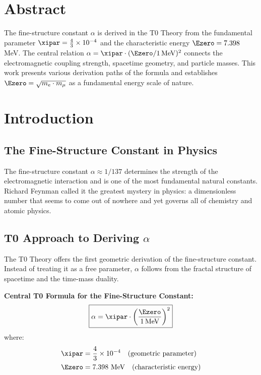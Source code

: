 \section*{Abstract}

		The fine-structure constant $\alpha$ is derived in the T0 Theory from the fundamental parameter $\xipar = \frac{4}{3} \times 10^{-4}$ and the characteristic energy $\Ezero = 7.398$ MeV. The central relation $\alpha = \xipar \cdot (\Ezero/1\,\text{MeV})^2$ connects the electromagnetic coupling strength, spacetime geometry, and particle masses. This work presents various derivation paths of the formula and establishes $\Ezero = \sqrt{m_e \cdot m_\mu}$ as a fundamental energy scale of nature.

	
	
	\section{Introduction}
	
	\subsection{The Fine-Structure Constant in Physics}
	
	The fine-structure constant $\alpha \approx 1/137$ determines the strength of the electromagnetic interaction and is one of the most fundamental natural constants. Richard Feynman called it the greatest mystery in physics: a dimensionless number that seems to come out of nowhere and yet governs all of chemistry and atomic physics.
	
	\subsection{T0 Approach to Deriving $\alpha$}
	
	The T0 Theory offers the first geometric derivation of the fine-structure constant. Instead of treating it as a free parameter, $\alpha$ follows from the fractal structure of spacetime and the time-mass duality.
	
	\begin{keyresult}
		\textbf{Central T0 Formula for the Fine-Structure Constant:}
		\begin{equation}
			\boxed{\alpha = \xipar \cdot \left(\frac{\Ezero}{1\,\text{MeV}}\right)^2}
			\label{eq:alpha_main}
		\end{equation}
		where:
		\begin{align}
			\xipar &= \frac{4}{3} \times 10^{-4} \quad \text{(geometric parameter)}\\
			\Ezero &= 7.398 \text{ MeV} \quad \text{(characteristic energy)}
		\end{align}
	\end{keyresult}
	

